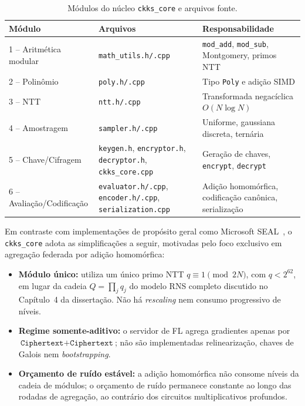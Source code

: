 \documentclass[11pt,a4paper]{report}
\begin{document}
\begin{table}[ht]
\centering
\caption{Módulos do núcleo \texttt{ckks\_core} e arquivos fonte.}
\label{tab:modulos}
\begin{tabular}{llp{7cm}}
\toprule
\textbf{Módulo} & \textbf{Arquivos} & \textbf{Responsabilidade} \\
\midrule
1 – Aritmética modular & \texttt{math\_utils.h/.cpp} & \texttt{mod\_add}, \texttt{mod\_sub}, Montgomery, primos NTT \\
2 – Polinômio & \texttt{poly.h/.cpp} & Tipo \texttt{Poly} e adição SIMD \\
3 – NTT & \texttt{ntt.h/.cpp} & Transformada negacíclica $O(N\log N)$ \\
4 – Amostragem & \texttt{sampler.h/.cpp} & Uniforme, gaussiana discreta, ternária \\
5 – Chave/Cifragem & \texttt{keygen.h}, \texttt{encryptor.h}, \texttt{decryptor.h}, \texttt{ckks\_core.cpp} & Geração de chaves, \texttt{encrypt}, \texttt{decrypt} \\
6 – Avaliação/Codificação & \texttt{evaluator.h/.cpp}, \texttt{encoder.h/.cpp}, \texttt{serialization.cpp} & Adição homomórfica, codificação canônica, serialização \\
\bottomrule
\end{tabular}
\end{table}

Em contraste com implementações de propósito geral como Microsoft SEAL~\cite{sealmanual},
o \texttt{ckks\_core} adota as simplificações a seguir, motivadas pelo foco exclusivo
em agregação federada por adição homomórfica:

\begin{itemize}
  \item \textbf{Módulo único:} utiliza um único primo NTT $q \equiv 1 \pmod{2N}$, com
    $q < 2^{62}$, em lugar da cadeia $Q = \prod_j q_j$ do modelo RNS completo discutido
    no Capítulo~4 da dissertação. Não há \emph{rescaling} nem consumo progressivo de níveis.
  \item \textbf{Regime somente-aditivo:} o servidor de FL agrega gradientes apenas por
    $\texttt{Ciphertext} + \texttt{Ciphertext}$; não são implementadas relinearização,
    chaves de Galois nem \emph{bootstrapping}.
  \item \textbf{Orçamento de ruído estável:} a adição homomórfica não consome níveis da
    cadeia de módulos; o orçamento de ruído permanece constante ao longo das rodadas de
    agregação, ao contrário dos circuitos multiplicativos profundos.
\end{itemize}
\end{document}
